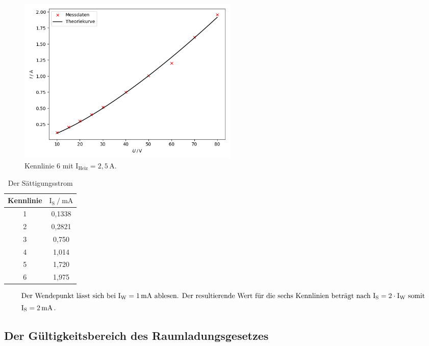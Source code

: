 \begin{figure}[H]
    \centering
    \includegraphics[height=80mm]{bilder/K6.png}
    \caption{Kennlinie 6 mit $\text{I}_{\text{Heiz}} = 2,5\,\unit{\ampere} $.\label{Abbildung11} }
\end{figure}


\begin{table}[H]     %
    \centering
    \caption{Der Sättigungsstrom}
    \label{Tabelle2}
    \begin{tabular} {c c}
        \toprule
        {Kennlinie} &
        {$\text{I}_{\text{S}} \mathbin{/} \unit{\milli\ampere} $} \\
        \midrule
        1 & 0,1338 \\
        2 & 0,2821 \\
        3 & 0,750 \\
        4 & 1,014 \\
        5 & 1,720 \\
        6 & 1,975 \\
        \bottomrule
    \end{tabular} 
\end{table}

\begin{align*}
    \intertext{Der Wendepunkt lässt sich bei $\text{I}_{\text{W}} = 1\,\unit{\milli\ampere}$ ablesen.
    Der resultierende Wert für die sechs Kennlinien beträgt nach $\text{I}_{\text{S}} = 2 \cdot \text{I}_{\text{W}}$ somit}
    \text{I}_{\text{S}} = 2\,\unit{\milli\ampere} \,.
\end{align*}

\subsection{Der Gültigkeitsbereich des Raumladungsgesetzes}

